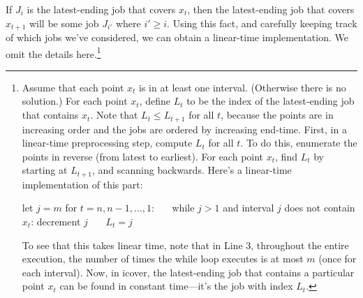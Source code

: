 If $J_i$ is the latest-ending job that covers $x_t$,
then the latest-ending job that covers $x_{t+1}$ will be some job $J_{i'}$ where $i'\ge i$.
Using this fact, and carefully keeping track of which jobs we've considered,
we can obtain a linear-time implementation.  We omit the details here.\footnote
{Assume that each point $x_t$ is in at least one interval.  (Otherwise there is no solution.)
  For each point $x_t$, define $L_t$ to be the index of the latest-ending job that contains $x_t$.
  Note that $L_t \le L_{t+1}$ for all $t$, because the points are in increasing order and the jobs are ordered by increasing end-time.
First, in a linear-time preprocessing step, compute $L_t$ for all $t$.  To do this, enumerate the points in reverse (from latest to earliest).  For each point $x_t$, find $L_t$ by starting at $L_{t+1}$, and scanning backwards.  Here's a linear-time implementation of this part:
 
\begin{myframed}
\begin{steps}
  \step let $j = m$
  \step for $t = n, n-1, \ldots, 1$:
  \step~~~while $j > 1$ and interval $j$ does not contain $x_t$:  decrement $j$
  \step~~~$L_t = j$
\end{steps}
\end{myframed}

To see that this takes linear time, note that in Line 3, throughout the entire execution, the number of times the while loop executes is at most $m$ (once for each interval).
Now, in \textsf{icover}, the latest-ending job that contains a particular point $x_t$ can be found in constant time---it's the job with index $L_t$.
}

